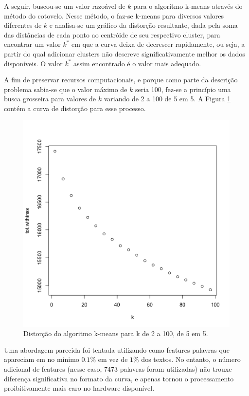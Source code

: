 \documentclass[10pt,twocolumn,letterpaper]{article}
\begin{document}
A seguir, buscou-se um valor razoável de $k$ para o algoritmo k-means através do método do cotovelo. Nesse método, o faz-se k-means para diversos valores diferentes de $k$ e analisa-se um gráfico da distorção resultante, dada pela soma das distâncias de cada ponto ao centróide de seu respectivo cluster, para encontrar um valor $k^{*}$ em que a curva deixa de decrescer rapidamente, ou seja, a partir do qual adicionar clusters não descreve significativamente melhor os dados disponíveis. O valor $k^{*}$ assim encontrado é o valor mais adequado.

A fim de preservar recursos computacionais, e porque como parte da descrição problema sabia-se que o valor máximo de $k$ seria 100, fez-se a princípio uma busca grosseira para valores de $k$ variando de 2 a 100 de 5 em 5. A Figura \ref{fig-five-by-five} contém a curva de distorção para esse processo.

\begin{figure}
\begin{center}
	\includegraphics[width=0.99\columnwidth]{pics/five-by-five}
	\caption{Distorção do algoritmo k-means para k de 2 a 100, de 5 em 5.}
	\label{fig-five-by-five}   
\end{center} 
\end{figure}   

Uma abordagem parecida foi tentada utilizando como features palavras que apareciam em no mínimo $0.1\%$ em vez de $1\%$ dos textos. No entanto, o número adicional de features (nesse caso, 7473 palavras foram utilizadas) não trouxe diferença significativa no formato da curva, e apenas tornou o processamento proibitivamente mais caro no hardware disponível.
\end{document}
